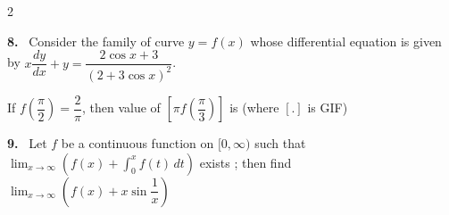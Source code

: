 \documentclass[10pt]{extarticle}
\newcommand{\qn}[1]{\par\smallskip\noindent\textbf{#1.}~}
\begin{document}
\begin{multicols}{2}
\qn{8} Consider the family of curve $y=f(x)$ whose differential equation is given by $x\dfrac{dy}{dx}+y=\dfrac{2\cos x+3}{(2+3\cos x)^2}$.

If $f\left(\dfrac{\pi}{2}\right)=\dfrac{2}{\pi}$, then value of $\left[\pi f\left(\dfrac{\pi}{3}\right)\right]$ is (where $[.]$ is GIF)

\qn{9} Let $f$ be a continuous function on $[0,\infty)$ such that $\displaystyle\lim_{x\to\infty}\left(f(x)+\int_0^xf(t)\,dt\right)$ exists ; then find $\displaystyle\lim_{x\to\infty}\left(f(x)+x\sin\dfrac1x\right)$
\end{multicols}
\end{document}
